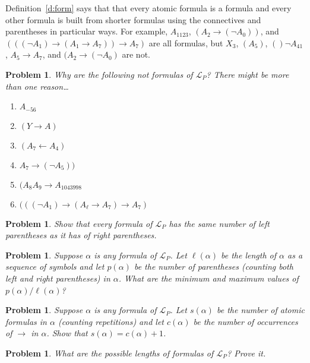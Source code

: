 \documentclass[12pt]{amsbook}
\theoremstyle{plain}
\newtheorem{prob}[thm]{Problem}
\theoremstyle{definition}
\theoremstyle{remark}
\begin{document}
Definition~\ref{d:form} says that that every atomic formula is a formula and every other formula is built from shorter formulas using the connectives and parentheses in particular ways.  For example,  $A_{1123}$,  $(A_2 \to (\lnot A_0))$,  and $(((\lnot A_1) \to (A_1 \to A_7) ) \to A_7)$ are all formulas,  but $X_3$,  $(A_5)$,  $()\lnot A_{41}$,  $A_5 \to A_7$,  and $(A_2 \to (\lnot A_0)$ are not. 

\begin{prob} \label{p:one1}
Why are the following {\em not\/} formulas of $\mathcal{L}_P$?  There might be more than one reason\dots
\begin{enumerate}
\item $A_{-56}$
\item $(Y \to A)$
\item $(A_7 \leftarrow A_4)$
\item $A_7 \to (\lnot A_5))$
\item $(A_8 A_9 \to A_{1043998}$
\item $(((\lnot A_1) \to (A_\ell \to A_7) \to A_7)$
\end{enumerate}
\end{prob}

\begin{prob} \label{p:lrp}
Show that every formula of $\mathcal{L}_P$ has the same number of left parentheses as it has of right parentheses.
\end{prob}

\begin{prob} \label{p:one3}
Suppose $\alpha$ is any formula of $\mathcal{L}_P$.  Let $\ell(\alpha)$ be the length of $\alpha$ as a sequence of symbols and let $p(\alpha)$ be the number of parentheses (counting both left and right parentheses) in $\alpha$.  What are the minimum and maximum values of $p(\alpha) /  \ell(\alpha)$?
\end{prob}

\begin{prob} \label{p:one4}
Suppose $\alpha$ is any formula of $\mathcal{L}_P$.  Let $s(\alpha)$ be the number of atomic formulas in $\alpha$ (counting repetitions) and let $c(\alpha)$ be the number of occurrences of $\to$ in $\alpha$.  Show that $s(\alpha) = c(\alpha) + 1$.
\end{prob}

\begin{prob} \label{p:lof}
What are the possible lengths of formulas of $\mathcal{L}_P$?  Prove it.
\end{prob}
\end{document}
